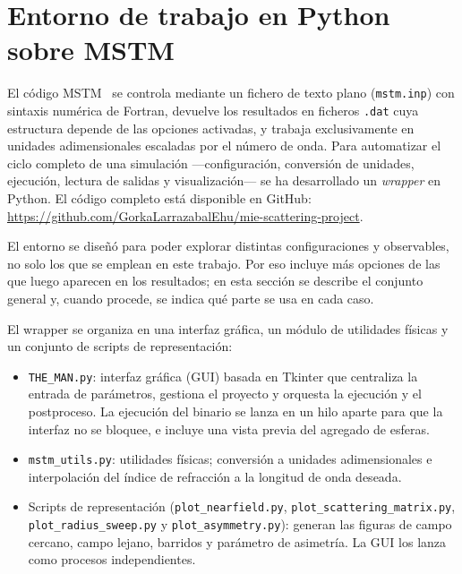 \section{Entorno de trabajo en Python sobre MSTM}
\label{sec:python_wrapper}

El código MSTM~\cite{Mackowski_code} se controla mediante un fichero
de texto plano (\texttt{mstm.inp}) con sintaxis numérica de Fortran,
devuelve los resultados en ficheros \texttt{.dat} cuya estructura
depende de las opciones activadas, y trabaja exclusivamente en unidades
adimensionales escaladas por el número de onda. Para automatizar el
ciclo completo de una simulación ---configuración, conversión de
unidades, ejecución, lectura de salidas y visualización--- se ha
desarrollado un \emph{wrapper} en Python. El código completo
está disponible en GitHub:
\url{https://github.com/GorkaLarrazabalEhu/mie-scattering-project}.

El entorno se diseñó para poder explorar distintas configuraciones y
observables, no solo los que se emplean en este trabajo. Por eso
incluye más opciones de las que luego aparecen en los resultados; en
esta sección se describe el conjunto general y, cuando procede, se
indica qué parte se usa en cada caso.

El wrapper se organiza en una interfaz gráfica, un módulo de utilidades
físicas y un conjunto de scripts de representación:

\begin{itemize}
    \item \texttt{THE\_MAN.py}: interfaz gráfica (GUI) basada en
          Tkinter que centraliza la entrada de parámetros, gestiona el
          proyecto y orquesta la ejecución y el postproceso. La
          ejecución del binario se lanza en un hilo aparte para que la
          interfaz no se bloquee, e incluye una vista previa del
          agregado de esferas.
    \item \texttt{mstm\_utils.py}: utilidades físicas; conversión a
          unidades adimensionales e interpolación del índice de
          refracción a la longitud de onda deseada.
    \item Scripts de representación (\texttt{plot\_nearfield.py},
          \texttt{plot\_scattering\_matrix.py},
          \texttt{plot\_radius\_sweep.py} y
          \texttt{plot\_asymmetry.py}): generan las figuras de campo
          cercano, campo lejano, barridos y parámetro de asimetría. La
          GUI los lanza como procesos independientes.
\end{itemize}

